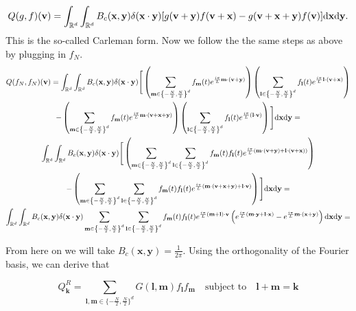\documentclass{article}
\def\t{\text}
\def\b{\mathbf}
\begin{document}
\[
    Q(g,f)(\b v) = \int_{\mathbb{R}^d} \int_{\mathbb{R}^d} B_c(\b x, \b y) \delta( \b x \cdot \b y)[g(\b v + \b y) f(\b v + \b x) - g(\b v + \b x + \b y) f(\b v)] \t d \b x \t d \b y.
\]
This is the so-called Carleman form. Now we follow the the same steps as above by plugging in $f_N$. 
\begin{gather*}
    Q(f_N,f_N)(\b v) = \int_{\mathbb{R}^d} \int_{\mathbb{R}^d} B_c(\b x, \b y) \delta( \b x \cdot \b y)\Bigg[ \left( \sum_{\b m \in \left\{-\frac{N}{2}, \frac{N}{2}\right\}^d} f_{\b m}(t) e^{\frac{i \pi}{L} \b m \cdot (\b v + \b y) } \right) \left( \sum_{\b l \in \left\{-\frac{N}{2}, \frac{N}{2}\right\}^d} f_{\b l}(t) e^{\frac{i \pi}{L} \b l \cdot (\b v + \b x) } \right)\\
    - \left( \sum_{\b m \in \left\{-\frac{N}{2}, \frac{N}{2}\right\}^d} f_{\b m}(t) e^{\frac{i \pi}{L} \b m \cdot (\b v + \b x + \b y) } \right) \left( \sum_{\b l \in \left\{-\frac{N}{2}, \frac{N}{2}\right\}^d} f_{\b l}(t) e^{\frac{i \pi}{L}(\b l \cdot \b v ) } \right) \Bigg] \t d \b x \t d \b y = \\
    \int_{\mathbb{R}^d} \int_{\mathbb{R}^d} B_c(\b x, \b y) \delta( \b x \cdot \b y)\Bigg[ \left( \sum_{\b m \in \left\{-\frac{N}{2}, \frac{N}{2}\right\}^d} \sum_{\b l \in \left\{-\frac{N}{2}, \frac{N}{2}\right\}^d} f_{\b m}(t) f_{\b l}(t) e^{\frac{i \pi}{L} (\b m \cdot (\b v + \b y) + \b l \cdot (\b v + \b x)) } \right)\\
    - \left( \sum_{\b m \in \left\{-\frac{N}{2}, \frac{N}{2}\right\}^d} \sum_{\b l \in \left\{-\frac{N}{2}, \frac{N}{2}\right\}^d} f_{\b m}(t) f_{\b l}(t) e^{\frac{i \pi}{L} (\b m \cdot (\b v + \b x + \b y) + \b l \cdot \b v) } \right) \Bigg] \t d \b x \t d \b y = \\
    \int_{\mathbb{R}^d} \int_{\mathbb{R}^d} B_c(\b x, \b y) \delta( \b x \cdot \b y) \sum_{\b m \in \left\{-\frac{N}{2}, \frac{N}{2}\right\}^d} \sum_{\b l \in \left\{-\frac{N}{2}, \frac{N}{2}\right\}^d} f_{\b m}(t) f_{\b l}(t) e^{\frac{i \pi}{L} (\b m + \b l) \cdot \b v} \left( e^{\frac{i \pi}{L} (\b m \cdot \b y + \b l \cdot \b x) } - e^{\frac{i \pi}{L} \b m \cdot (\b x + \b y) }\right) \t d \b x \t d \b y = 
\end{gather*}

From here on we will take $B_c(\b x, \b y) = \frac{1}{2 \pi}$. Using the orthogonality of the Fourier basis, we can derive that

\begin{equation} \label{eq:QR_carl}
    Q^R_{\b k} = \sum_{\b l,\b m \in \{-\frac{N}{2}, \frac{N}{2}\}^d} G(\b l,\b m) f_{\b l} f_{\b m} \quad \text{subject to} \quad \b l + \b m = \b k
\end{equation}
\end{document}
